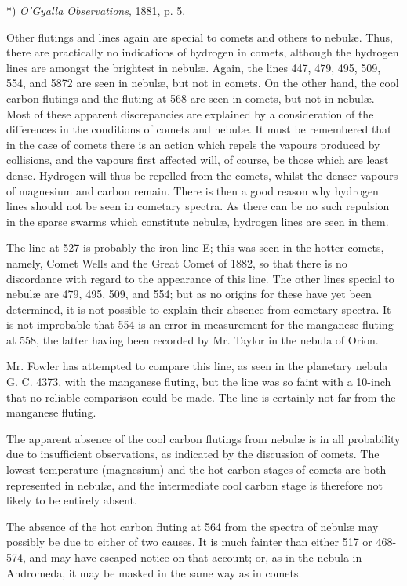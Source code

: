 \documentclass[a4paper, 12pt, oneside, polutonikogreek, english]{article}
\begin{document}
*) \emph{O'Gyalla Observations}, 1881, p. 5.

Other flutings and lines again are special to comets and others to nebulæ. Thus, there are practically no indications of hydrogen in comets, although the hydrogen lines are amongst the brightest in nebulæ. Again, the lines 447, 479, 495, 509, 554, and 5872 are seen in nebulæ, but not in comets. On the other hand, the cool carbon flutings and the fluting at 568 are seen in comets, but not in nebulæ. Most of these apparent discrepancies are explained by a consideration of the differences in the conditions of comets and nebulæ. It must be remembered that in the case of comets there is an action which repels the vapours produced by collisions, and the vapours first affected will, of course, be those which are least dense. Hydrogen will thus be repelled from the comets, whilst the denser vapours of magnesium and carbon remain. There is then a good reason why hydrogen lines should not be seen in cometary spectra. As there can be no such repulsion in the sparse swarms which constitute nebulæ, hydrogen lines are seen in them.

The line at 527 is probably the iron line E; this was seen in the hotter comets, namely, Comet Wells and the Great Comet of 1882, so that there is no discordance with regard to the appearance of this line. The other lines special to nebulæ are 479, 495, 509, and 554; but as no origins for these have yet been determined, it is not possible to explain their absence from cometary spectra. It is not improbable that 554 is an error in measurement for the manganese fluting at 558, the latter having been recorded by Mr. Taylor in the nebula of Orion.

Mr. Fowler has attempted to compare this line, as seen in the planetary nebula G. C. 4373, with the manganese fluting, but the line was so faint with a 10-inch that no reliable comparison could be made. The line is certainly not far from the manganese fluting.

The apparent absence of the cool carbon flutings from nebulæ is in all probability due to insufficient observations, as indicated by the discussion of comets. The lowest temperature (magnesium) and the hot carbon stages of comets are both represented in nebulæ, and the intermediate cool carbon stage is therefore not likely to be entirely absent.

The absence of the hot carbon fluting at 564 from the spectra of nebulæ may possibly be due to either of two causes. It is much fainter than either 517 or 468-574, and may have escaped notice on that account; or, as in the nebula in Andromeda, it may be masked in the same way as in comets.
\end{document}
